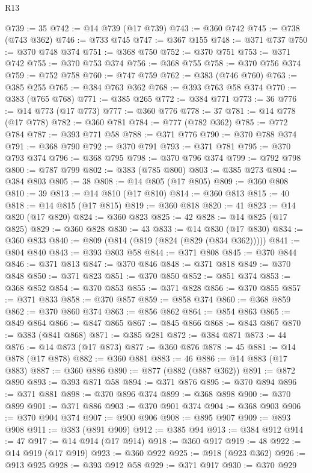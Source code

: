 \begin{lexlean}{R13}
\begin{coremodule}
@739 := 35
@742 := @14 @739 (@17 @739)
@743 := @360 @742
@745 := @738 (@743 @362)
@746 := @733 @745
@747 := @367 @155
@748 := @371 @737
@750 := @370 @748 @374
@751 := @368 @750
@752 := @370 @751
@753 := @371 @742
@755 := @370 @753 @374
@756 := @368 @755
@758 := @370 @756 @374
@759 := @752 @758
@760 := @747 @759
@762 := @383 (@746 @760)
@763 := @385 @255
@765 := @384 @763 @362
@768 := @393 @763 @58 @374
@770 := @383 (@765 @768)
@771 := @385 @265
@772 := @384 @771
@773 := 36
@776 := @14 @773 (@17 @773)
@777 := @360 @776
@778 := 37
@781 := @14 @778 (@17 @778)
@782 := @360 @781
@784 := @777 (@782 @362)
@785 := @772 @784
@787 := @393 @771 @58
@788 := @371 @776
@790 := @370 @788 @374
@791 := @368 @790
@792 := @370 @791
@793 := @371 @781
@795 := @370 @793 @374
@796 := @368 @795
@798 := @370 @796 @374
@799 := @792 @798
@800 := @787 @799
@802 := @383 (@785 @800)
@803 := @385 @273
@804 := @384 @803
@805 := 38
@808 := @14 @805 (@17 @805)
@809 := @360 @808
@810 := 39
@813 := @14 @810 (@17 @810)
@814 := @360 @813
@815 := 40
@818 := @14 @815 (@17 @815)
@819 := @360 @818
@820 := 41
@823 := @14 @820 (@17 @820)
@824 := @360 @823
@825 := 42
@828 := @14 @825 (@17 @825)
@829 := @360 @828
@830 := 43
@833 := @14 @830 (@17 @830)
@834 := @360 @833
@840 := @809 (@814 (@819 (@824 (@829 (@834 @362)))))
@841 := @804 @840
@843 := @393 @803 @58
@844 := @371 @808
@845 := @370 @844
@846 := @371 @813
@847 := @370 @846
@848 := @371 @818
@849 := @370 @848
@850 := @371 @823
@851 := @370 @850
@852 := @851 @374
@853 := @368 @852
@854 := @370 @853
@855 := @371 @828
@856 := @370 @855
@857 := @371 @833
@858 := @370 @857
@859 := @858 @374
@860 := @368 @859
@862 := @370 @860 @374
@863 := @856 @862
@864 := @854 @863
@865 := @849 @864
@866 := @847 @865
@867 := @845 @866
@868 := @843 @867
@870 := @383 (@841 @868)
@871 := @385 @281
@872 := @384 @871
@873 := 44
@876 := @14 @873 (@17 @873)
@877 := @360 @876
@878 := 45
@881 := @14 @878 (@17 @878)
@882 := @360 @881
@883 := 46
@886 := @14 @883 (@17 @883)
@887 := @360 @886
@890 := @877 (@882 (@887 @362))
@891 := @872 @890
@893 := @393 @871 @58
@894 := @371 @876
@895 := @370 @894
@896 := @371 @881
@898 := @370 @896 @374
@899 := @368 @898
@900 := @370 @899
@901 := @371 @886
@903 := @370 @901 @374
@904 := @368 @903
@906 := @370 @904 @374
@907 := @900 @906
@908 := @895 @907
@909 := @893 @908
@911 := @383 (@891 @909)
@912 := @385 @94
@913 := @384 @912
@914 := 47
@917 := @14 @914 (@17 @914)
@918 := @360 @917
@919 := 48
@922 := @14 @919 (@17 @919)
@923 := @360 @922
@925 := @918 (@923 @362)
@926 := @913 @925
@928 := @393 @912 @58
@929 := @371 @917
@930 := @370 @929

\end{coremodule}
\end{lexlean}
